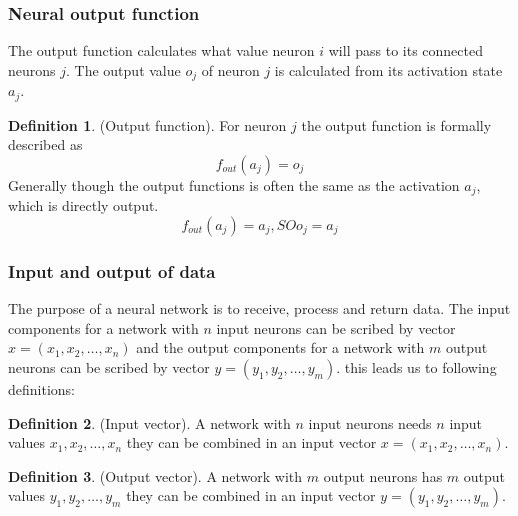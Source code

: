 \documentclass[pdftex,a4paper,12pt,twoside]{report}
\theoremstyle{plain} \newtheorem{theorem}{Theorem} \newtheorem{proposition}{Proposition} \newtheorem{lemma}{Lemma} \newtheorem*{corollary}{Corollary}
\theoremstyle{definition} \newtheorem{definition}{Definition} \newtheorem{conjecture}{Conjecture} \newtheorem*{example}{Example} \newtheorem{algorithm}{Algorithm}
\theoremstyle{remark} \newtheorem*{remark}{Remark} \newtheorem*{note}{Note} \newtheorem{case}{Case}
\begin{document}
\subsubsection{Neural output function}
The output function calculates what value neuron $i$ will pass to its connected neurons $j$. The output value $o_j$  of neuron $j$ is calculated from its activation state $a_j$.
\begin{definition}
(Output function). For neuron $j$ the output function is formally described as
\begin{equation}
f _{out}(a_j) = o_j
\end{equation}
Generally though the output functions is often the same as the activation $a_j$, which is directly output.
\begin{equation}
f _{out}(a_j) = a_j,SO o_j = a_j
\end{equation}
\end{definition}
\subsubsection{Input and output of data}
The purpose of a neural network is to receive, process and return data. The input components for a network with $n$ input neurons can be scribed by vector $x = (x_1,x_2, \dotsc ,x_n)$ and the output components for a network with $m$ output neurons can be scribed by vector $y = (y_1,y_2, \dotsc ,y_m)$. this leads us to following definitions:
\begin{definition}
(Input vector). A network with $n$ input neurons needs $n$ input values $x_1,x_2, \dotsc ,x_n$ they can be combined in an input vector $x = (x_1,x_2, \dotsc ,x_n)$.
\end{definition}
\begin{definition}
(Output vector).  A network with $m$ output neurons has $m$ output values $y_1,y_2, \dotsc ,y_m$ they can be combined in an input vector $y = (y_1,y_2, \dotsc ,y_m)$.
\end{definition}
\end{document}
